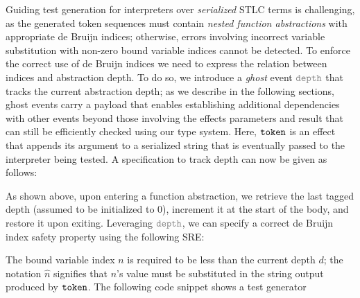 Guiding test generation for interpreters over \emph{serialized} STLC
terms is challenging, as the generated token sequences must contain
\emph{nested function abstractions} with appropriate de Bruijn
indices; otherwise, errors involving incorrect variable substitution
with non-zero bound variable indices cannot be detected. To enforce
the correct use of de Bruijn indices we need to express the relation
between indices and abstraction depth.  To do so, we introduce a
\emph{ghost} event $\effGray{depth}$ that tracks the current
abstraction depth;  as we describe
in the following sections, ghost events carry a payload that enables
establishing additional dependencies with other events beyond those involving
the effects parameters and result that can still be efficiently checked using
our type system.  Here, $\boldsymbol{{\tt token}}$ is an effect that appends its
argument to a serialized string that is eventually passed to the
interpreter being tested.    A \tyName{} specification to track depth can
  now be given as follows:
  \vspace{-.4cm} \par{}\vspace{-.5cm} \par\nobreak\noindent
  As shown above, upon entering a function abstraction, we retrieve
  the last tagged depth (assumed to be initialized to $0$), increment it at the
  start of the body, and restore it upon exiting. Leveraging
  $\effGray{depth}$, we can specify a correct de Bruijn index
  safety property using the following SRE:
  \vspace{-.4cm} \par{}\vspace{-.5cm} \par\nobreak\noindent
  The bound variable index $n$ is required to be less than the
  current depth $d$; the notation $\widehat{n}$ signifies that $n$'s value must
  be substituted in the string output produced by $\boldsymbol{{\tt token}}$.  The following code snippet shows a test generator
